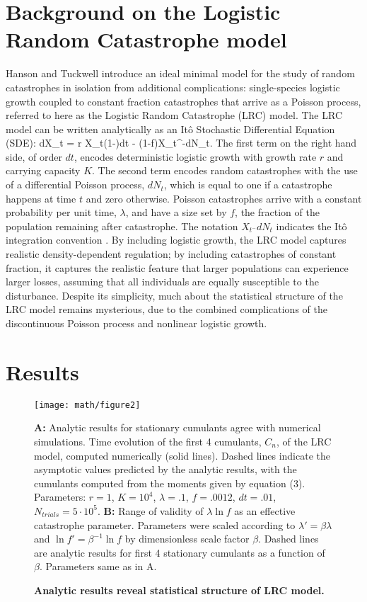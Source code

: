 \section{Background on the Logistic Random Catastrophe model}

Hanson and Tuckwell \cite{hanson1981} introduce an ideal minimal model for the study of random catastrophes in isolation from additional complications: single-species logistic growth coupled to constant fraction catastrophes that arrive as a Poisson process, referred to here as the Logistic Random Catastrophe (LRC) model.  The LRC model can be written analytically as an It\^{o} Stochastic Differential Equation (SDE):
\be
dX_t = r X_t\left(1-\right)dt  - (1-f)X_{t^-}dN_t.
\ee
\noindent The first term on the right hand side, of order $dt$, encodes deterministic logistic growth with growth rate $r$ and carrying capacity $K$.  The second term encodes random catastrophes with the use of a differential Poisson process, $dN_t$, which is equal to one if a catastrophe happens at time $t$ and zero otherwise.  Poisson catastrophes arrive with a constant probability per unit time, $\lambda$, and have a size set by $f$, the fraction of the population remaining after catastrophe.  The notation $X  _{t^-}dN_t$ indicates the It\^{o} integration convention \cite{hansonBook}.  By including logistic growth, the LRC model captures realistic density-dependent regulation; by including catastrophes of constant fraction, it captures the realistic feature that larger populations can experience larger losses, assuming that all individuals are equally susceptible to the disturbance.  Despite its simplicity, much about the statistical structure of the LRC model remains mysterious, due to the combined complications of the discontinuous Poisson process and nonlinear logistic growth.

\section{Results}

\begin{figure}
	\centerline{
		\texttt{[image: math/figure2]}}
	\caption{\textbf{Analytic results reveal statistical structure of LRC model.}}  {\textbf{A:  }Analytic results for stationary cumulants agree with numerical simulations.  Time evolution of the first 4 cumulants, $C_n$, of the LRC model, computed numerically (solid lines).  Dashed lines indicate the asymptotic values predicted by the analytic results, with the cumulants computed from the moments given by equation (3).  Parameters:  $r = 1$, $K = 10^4$, $\lambda = .1$, $f = .0012$, $dt = .01$, $N_{trials} = 5\cdot 10^5$.  \textbf{B:  }Range of validity of $\lambda\ln f$ as an effective catastrophe parameter.  Parameters were scaled according to $\lambda' = \beta\lambda$ and $\ln f' = \beta^{-1}\ln f$ by dimensionless scale factor $\beta$.  Dashed lines are analytic results for first 4 stationary cumulants as a function of $\beta$.  Parameters same as in A.}
\end{figure}

